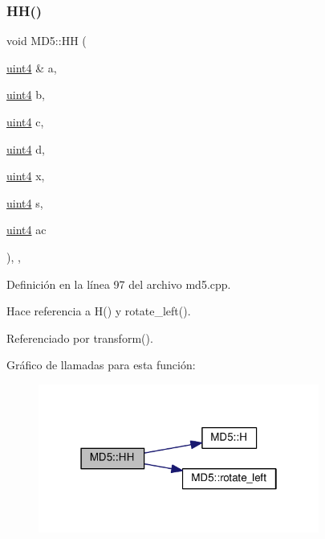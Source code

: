 \subsubsection{\texorpdfstring{H\+H()}{HH()}}
{\footnotesize\ttfamily void M\+D5\+::\+HH (\begin{DoxyParamCaption}\item[{\hyperlink{classMD5_a2e5b84a3d7db292f49873061214a0444}{uint4} \&}]{a,  }\item[{\hyperlink{classMD5_a2e5b84a3d7db292f49873061214a0444}{uint4}}]{b,  }\item[{\hyperlink{classMD5_a2e5b84a3d7db292f49873061214a0444}{uint4}}]{c,  }\item[{\hyperlink{classMD5_a2e5b84a3d7db292f49873061214a0444}{uint4}}]{d,  }\item[{\hyperlink{classMD5_a2e5b84a3d7db292f49873061214a0444}{uint4}}]{x,  }\item[{\hyperlink{classMD5_a2e5b84a3d7db292f49873061214a0444}{uint4}}]{s,  }\item[{\hyperlink{classMD5_a2e5b84a3d7db292f49873061214a0444}{uint4}}]{ac }\end{DoxyParamCaption})\hspace{0.3cm}{\ttfamily [inline]}, {\ttfamily [static]}, {\ttfamily [private]}}



Definición en la línea 97 del archivo md5.\+cpp.



Hace referencia a H() y rotate\+\_\+left().



Referenciado por transform().

Gráfico de llamadas para esta función\+:\nopagebreak
\begin{figure}[H]
\begin{center}
\leavevmode
\includegraphics[width=262pt]{classMD5_aaad039caf0b33abf1bf3f3589166543c_cgraph}
\end{center}
\end{figure}
\hypertarget{classMD5_ad2c1682834e38219894728830e3996c3}{}\label{classMD5_ad2c1682834e38219894728830e3996c3} 
